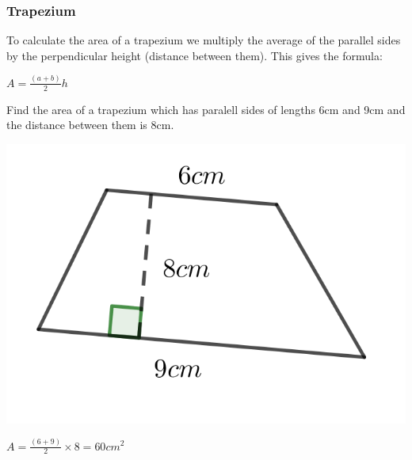 \subsubsection{Trapezium}
To calculate the area of a trapezium we multiply the average of the parallel sides by the perpendicular height (distance between them).  This gives the formula:

\bigskip

$A=\frac{(a+b)}{2}h$

\begin{exmp}
	Find the area of a trapezium which has paralell sides of lengths 6cm and 9cm and the distance between them is 8cm.

\bigskip

\includegraphics{./Images/Measurement/AreaEg4.png}

\bigskip

$A= \frac{(6+9)}{2}\times 8 = 60 cm^2 $
\end{exmp}


